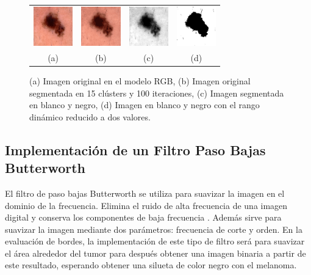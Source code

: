 \begin{figure}[h] 
\begin{center} 
 \begin{tabular}{cccc}
        \includegraphics[width=1.7cm]{images/F01-A.png} &
        \includegraphics[width=1.7cm]{images/F03-A.png} & 
        \includegraphics[width=1.7cm]{images/F04-A.png} & 
        \includegraphics[width=1.7cm]{images/F04-B.png} \\
    (a) & (b) & (c) & (d)\\
  \end{tabular}
\end{center} 
\vspace{-10pt}
\caption{\footnotesize (a) Imagen original en el modelo RGB, (b) Imagen original segmentada en 15 clústers y 100 iteraciones, (c) Imagen segmentada en blanco y negro, (d) Imagen en blanco y negro con el rango dinámico reducido a dos valores.}  
\label{fig04} 
\end{figure}

\subsection{Implementación de un Filtro Paso Bajas Butterworth}

El filtro de paso bajas Butterworth se utiliza para suavizar la imagen en el dominio de la frecuencia. Elimina el ruido de alta frecuencia de una imagen digital y conserva los componentes de baja frecuencia \autocite{Makandar:2015, Gonzalez:2008}. Además sirve para suavizar la imagen mediante dos parámetros: frecuencia de corte y orden. En la evaluación de bordes, la implementación de este tipo de filtro será para suavizar el área alrededor del tumor para después obtener una imagen binaria a partir de este resultado, esperando obtener una silueta de color negro con el melanoma. 

